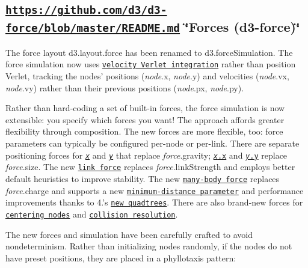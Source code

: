 \subsection*{\href{https://github.com/d3/d3-force/blob/master/README.md}{\tt https\+://github.\+com/d3/d3-\/force/blob/master/\+R\+E\+A\+D\+M\+E.\+md} \char`\"{}\+Forces (d3-\/force)\char`\"{}}

The force layout d3.\+layout.\+force has been renamed to d3.\+force\+Simulation. The force simulation now uses \href{https://en.wikipedia.org/wiki/Verlet_integration#Velocity_Verlet}{\tt velocity Verlet integration} rather than position Verlet, tracking the nodes’ positions ({\itshape node}.x, {\itshape node}.y) and velocities ({\itshape node}.vx, {\itshape node}.vy) rather than their previous positions ({\itshape node}.px, {\itshape node}.py).

Rather than hard-\/coding a set of built-\/in forces, the force simulation is now extensible\+: you specify which forces you want! The approach affords greater flexibility through composition. The new forces are more flexible, too\+: force parameters can typically be configured per-\/node or per-\/link. There are separate positioning forces for \href{https://github.com/d3/d3-force/blob/master/README.md#forceX}{\tt {\itshape x}} and \href{https://github.com/d3/d3-force/blob/master/README.md#forceY}{\tt {\itshape y}} that replace {\itshape force}.gravity; \href{https://github.com/d3/d3-force/blob/master/README.md#x_x}{\tt {\itshape x}.x} and \href{https://github.com/d3/d3-force/blob/master/README.md#y_y}{\tt {\itshape y}.y} replace {\itshape force}.size. The new \href{https://github.com/d3/d3-force/blob/master/README.md#forceLink}{\tt link force} replaces {\itshape force}.link\+Strength and employs better default heuristics to improve stability. The new \href{https://github.com/d3/d3-force/blob/master/README.md#forceManyBody}{\tt many-\/body force} replaces {\itshape force}.charge and supports a new \href{https://github.com/d3/d3-force/blob/master/README.md#manyBody_distanceMin}{\tt minimum-\/distance parameter} and performance improvements thanks to 4.’s \href{#quadtrees-d3-quadtree}{\tt new quadtrees}. There are also brand-\/new forces for \href{https://github.com/d3/d3-force/blob/master/README.md#forceCenter}{\tt centering nodes} and \href{https://github.com/d3/d3-force/blob/master/README.md#forceCollision}{\tt collision resolution}.

The new forces and simulation have been carefully crafted to avoid nondeterminism. Rather than initializing nodes randomly, if the nodes do not have preset positions, they are placed in a phyllotaxis pattern\+:



